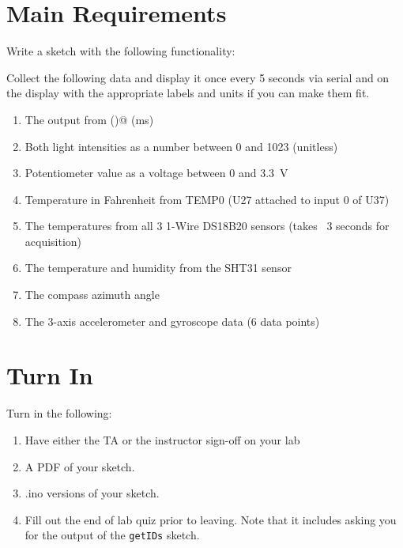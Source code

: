 \section{Main Requirements}
Write a sketch with the following functionality:

Collect the following data and display it once every 5 seconds via serial and on 
the display with the appropriate labels and units if you can make them fit.
\begin{enumerate}
	\item The output from \lstinline@millis()@ (ms)
	\item Both light intensities as a number between 0 and 1023 (unitless)
	\item Potentiometer value as a voltage between 0 and 3.3~V
	\item Temperature in Fahrenheit from TEMP0 (U27 attached to input 0 of U37)
 	\item The temperatures from all 3 1-Wire DS18B20 sensors (takes ~3 seconds for acquisition)
	\item The temperature and humidity from the SHT31 sensor
	\item The compass azimuth angle
	\item The 3-axis accelerometer and gyroscope data (6 data points)
\end{enumerate}

\section{Turn In}
Turn in the following:
\begin{enumerate}
    \item Have either the TA or the instructor sign-off on your lab
    \item A PDF of your sketch.
    \item .ino versions of your sketch.
    \item Fill out the end of lab quiz prior to leaving. Note that it includes asking you 
            for the output of the \lstinline$getIDs$ sketch. 
\end{enumerate}

